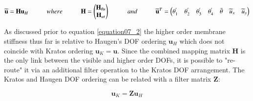\begin{equation} 
\widetilde{\mathbf{u}} = \mathbf{H} \mathbf{u}_H
\hspace{10mm}
where
\hspace{10mm}
\mathbf{H} =
\begin{pmatrix}
\mathbf{H}_{\theta u} \\
\mathbf{H}_{ut}
\end{pmatrix}
\hspace{10mm}
and
\hspace{10mm}
\widetilde{\mathbf{u}}^T = 
\begin{pmatrix}
\theta_1^{'} & \theta_2^{'} & \theta_3^{'} & \theta_4^{'} & \bar{\theta} &  \widetilde{u}_x & \widetilde{u}_y
\end{pmatrix}
\label{equation11}
\end{equation}

As discussed prior to equation \ref{equation07_2} the higher order membrane stiffness thus far is relative to Haugen's DOF ordering $\mathbf{u}_H$ which does not coincide with Kratos ordering $\mathbf{u}_K = \mathbf{u}$. Since the combined mapping matrix $\mathbf{H}$ is the only link between the visible and higher order DOFs, it is possible to "re-route" it via an additional filter operation to the Kratos DOF arrangement. The Kratos and Haugen DOF ordering can be related with a filter matrix $\mathbf{Z}$:

\begin{equation} 
\mathbf{u}_{K} = \mathbf{Z} \mathbf{u}_{H} 
\label{equation11_2}
\end{equation}


